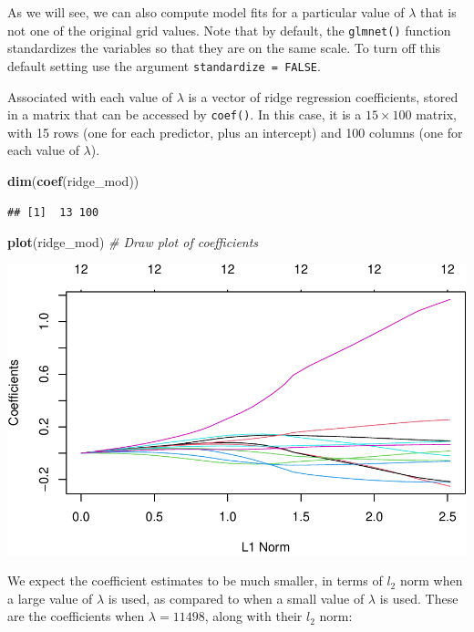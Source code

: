 \documentclass[]{article}
\newenvironment{Shaded}{\begin{snugshade}}{\end{snugshade}}
\newcommand{\KeywordTok}[1]{\textcolor[rgb]{0.13,0.29,0.53}{\textbf{#1}}}
\newcommand{\CommentTok}[1]{\textcolor[rgb]{0.56,0.35,0.01}{\textit{#1}}}
\newcommand{\NormalTok}[1]{#1}
\begin{document}
As we will see, we can also compute model fits for a particular value of
\(\lambda\) that is not one of the original grid values. Note that by
default, the \texttt{glmnet()} function standardizes the variables so
that they are on the same scale. To turn off this default setting use
the argument \texttt{standardize\ =\ FALSE}.

Associated with each value of \(\lambda\) is a vector of ridge
regression coefficients, stored in a matrix that can be accessed by
\texttt{coef()}. In this case, it is a \(15 \times 100\) matrix, with 15
rows (one for each predictor, plus an intercept) and 100 columns (one
for each value of \(\lambda\)).

\begin{Shaded}
\begin{Highlighting}[]
\KeywordTok{dim}\NormalTok{(}\KeywordTok{coef}\NormalTok{(ridge_mod))}
\end{Highlighting}
\end{Shaded}

\begin{verbatim}
## [1]  13 100
\end{verbatim}

\begin{Shaded}
\begin{Highlighting}[]
\KeywordTok{plot}\NormalTok{(ridge_mod)    }\CommentTok{# Draw plot of coefficients}
\end{Highlighting}
\end{Shaded}

\includegraphics{BodyFat_files/figure-latex/unnamed-chunk-22-1.pdf}

We expect the coefficient estimates to be much smaller, in terms of
\(l_2\) norm when a large value of \(\lambda\) is used, as compared to
when a small value of \(\lambda\) is used. These are the coefficients
when \(\lambda = 11498\), along with their \(l_2\) norm:
\end{document}
